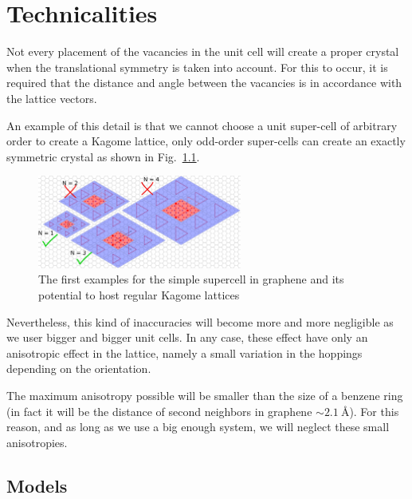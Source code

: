\chapter{Technicalities}
Not every placement of the vacancies in the unit cell will create a proper crystal when the translational symmetry is taken into account. For this to occur, it is required that the distance and angle between the vacancies is in accordance with the lattice vectors.

An example of this detail is that we cannot choose a unit super-cell of arbitrary order to create a Kagome lattice, only odd-order super-cells can create an exactly symmetric crystal as shown in Fig.~\ref{kagome}.
\begin{figure}[h!]
  \centering
  \includegraphics[width=0.6\textwidth]{artlat/fig/kagome_scale.pdf}
  \vspace{-5pt}
  \caption{The first examples for the simple supercell in graphene and its potential to host regular Kagome lattices}
  \label{kagome}
\end{figure}
\FloatBarrier
Nevertheless, this kind of inaccuracies will become more and more negligible as we user bigger and bigger unit cells.
In any case, these effect have only an anisotropic effect in the lattice, namely a small variation in the hoppings depending on the orientation.

The maximum anisotropy possible will be smaller than the size of a benzene ring (in fact it will be the distance of second neighbors in graphene $\sim\SI{2.1}{\angstrom}$). For this reason, and as long as we use a big enough system, we will neglect these small anisotropies.


\section{Models} %
\label{models}
